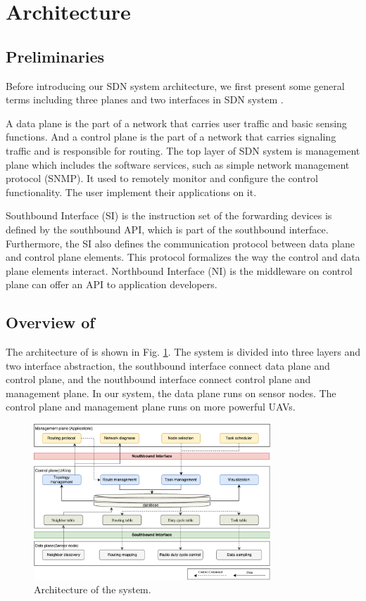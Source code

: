 \section{Architecture}
\label{Arc}
\subsection{Preliminaries}
Before introducing our SDN system architecture, we first present some general terms including three planes and two interfaces in SDN system \cite{kreutz2015software}.

A data plane is the part of a network that carries user traffic and basic sensing functions. And a control plane is the part of a network that carries signaling traffic and is responsible for routing. The top layer of SDN system is management plane which includes the software services, such as simple network management protocol (SNMP). It used to remotely monitor and configure the control functionality. The user implement their applications on it.

Southbound Interface (SI) is the instruction set of the forwarding devices is defined by the southbound API, which is part of the southbound interface. Furthermore, the SI also defines the communication protocol between data plane and control plane elements. This protocol formalizes the way the control and data plane elements interact. Northbound Interface (NI) is the middleware on control plane can offer an API to application developers.

\subsection{Overview of {\sdn}}
The architecture of {\sdn} is shown in Fig. \ref{Architecture}. 
The system is divided into three layers and two interface abstraction, the southbound interface connect data plane and control plane, and the nouthbound interface connect control plane and management plane. In our system, the data plane runs on sensor nodes. The control plane and management plane runs on more powerful UAVs.
\begin{figure}[htbp]
	\centering
	\includegraphics[width=3.5in]{./Figure/Architecture}
	\caption{Architecture of the system.}
	\label{Architecture}
\end{figure}

